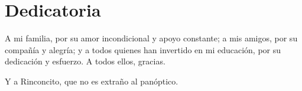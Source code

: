 \chapter*{Dedicatoria}


A mi familia, por su amor incondicional y apoyo constante;
a mis amigos, por su compañía y alegría;
y a todos quienes han invertido en mi educación, por su dedicación y esfuerzo.
A todos ellos, gracias.

Y a Rinconcito, que no es extraño al panóptico.
